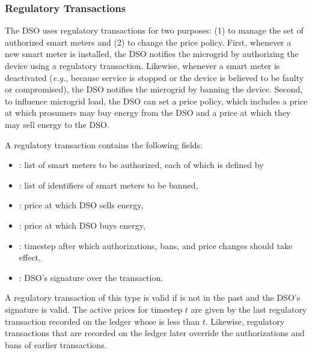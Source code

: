 \subsubsection{Regulatory Transactions}

The DSO uses regulatory transactions for two purposes: (1) to manage
the set of authorized smart meters and (2) to change the price policy.
First, whenever a new smart meter is installed, the DSO notifies the
microgrid by authorizing the device using a regulatory transaction.
Likewise, whenever a smart meter is deactivated (\emph{e.g.}, because
service is stopped or the device is believed to be faulty or
compromised), the DSO notifies the microgrid by banning the device.
Second, to influence microgrid load, the DSO can set a price policy,
which includes a price at which prosumers may buy energy from the DSO
and a price at which they may sell energy to the DSO.

A regulatory transaction contains the following fields:
\begin{itemize}[noitemsep,topsep=-\parskip]
\item {}: list of smart meters to be authorized, each
  of which is defined by
\item {}: list of identifiers of smart meters to be banned, 
\item {}: price at which DSO sells energy,
\item {}: price at which DSO buys energy,
\item {}: timestep after which authorizations, bans, and price changes should take effect,
\item {}: DSO's signature over the transaction.
\end{itemize}
\vspace{\parskip}

A regulatory transaction of this type is valid if 
 is not in the past and 
the DSO's signature is valid.
The active prices for timestep $t$ are given by the last regulatory
transaction recorded on the ledger whose  is less than
$t$.  Likewise, regulatory transactions that are recorded on the
ledger later override the authorizations and bans of earlier
transactions.

